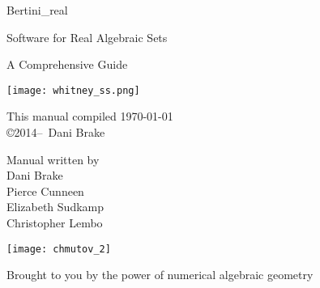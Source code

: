 \documentclass[10pt, twoside]{article}
\begin{document}
\pagestyle{front} 
	


\begin{titlepage}

	\begin{center}
	\vspace{2cm}
	{\Large Bertini\_real}

\vspace{\baselineskip}
	{\large Software for Real Algebraic Sets}



	{\large A Comprehensive Guide}	

	\vspace{3cm}
	\texttt{[image: whitney\_ss.png]}
	\end{center}

	\vfill

	\begin{minipage}{\linewidth}

	\begin{minipage}{0.4\linewidth}
	\centering
	This manual compiled \today \\
	\copyright 2014--\the\year\ Dani Brake
	\end{minipage}
	\hfill
	\begin{minipage}{0.4\linewidth}
	\centering Manual written by \vspace{\baselineskip}
	\\  Dani Brake \\ Pierce Cunneen \\ Elizabeth Sudkamp \\ Christopher Lembo
	\end{minipage}

	\end{minipage}

	

\end{titlepage}



\clearpage

\thispagestyle{empty}

\quad 
\vspace{2in}

\begin{center}
\texttt{[image: chmutov\_2]}

Brought to you by the power of numerical algebraic geometry
\end{center}


\vfill
\end{document}
